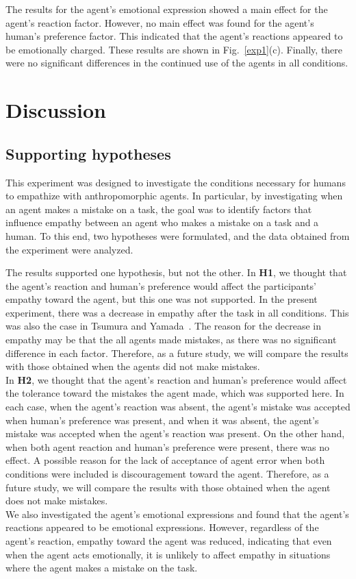 \documentclass[runningheads]{llncs}
\begin{document}
The results for the agent's emotional expression showed a main effect for the agent's reaction factor. 
However, no main effect was found for the agent's human's preference factor. 
This indicated that the agent's reactions appeared to be emotionally charged.
These results are shown in Fig.~\ref{exp1}(c).
Finally, there were no significant differences in the continued use of the agents in all conditions.

\section{Discussion}
\subsection{Supporting hypotheses}
This experiment was designed to investigate the conditions necessary for humans to empathize with anthropomorphic agents.
In particular, by investigating when an agent makes a mistake on a task, the goal was to identify factors that influence empathy between an agent who makes a mistake on a task and a human.
To this end, two hypotheses were formulated, and the data obtained from the experiment were analyzed.

The results supported one hypothesis, but not the other. 
In \textbf{H1}, we thought that the agent's reaction and human's preference would affect the participants' empathy toward the agent, but this one was not supported.
In the present experiment, there was a decrease in empathy after the task in all conditions. 
This was also the case in Tsumura and Yamada~\cite{Tsumura22}.
The reason for the decrease in empathy may be that the all agents made mistakes, as there was no significant difference in each factor.
Therefore, as a future study, we will compare the results with those obtained when the agents did not make mistakes.
\\ \indent
In \textbf{H2}, we thought that the agent's reaction and human's preference would affect the tolerance toward the mistakes the agent made, which was supported here.
In each case, when the agent's reaction was absent, the agent's mistake was accepted when human's preference was present, and when it was absent, the agent's mistake was accepted when the agent's reaction was present. 
On the other hand, when both agent reaction and human's preference were present, there was no effect. 
A possible reason for the lack of acceptance of agent error when both conditions were included is discouragement toward the agent. 
Therefore, as a future study, we will compare the results with those obtained when the agent does not make mistakes.
\\ \indent
We also investigated the agent's emotional expressions and found that the agent's reactions appeared to be emotional expressions. 
However, regardless of the agent's reaction, empathy toward the agent was reduced, indicating that even when the agent acts emotionally, it is unlikely to affect empathy in situations where the agent makes a mistake on the task.
\end{document}
